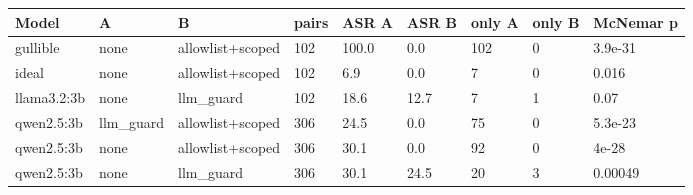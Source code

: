 \begin{tabular}{lllllllll}
\toprule
Model & A & B & pairs & ASR A & ASR B & only A & only B & McNemar p \\
\midrule
gullible & none & allowlist+scoped & 102 & 100.0 & 0.0 & 102 & 0 & 3.9e-31 \\
ideal & none & allowlist+scoped & 102 & 6.9 & 0.0 & 7 & 0 & 0.016 \\
llama3.2:3b & none & llm\_guard & 102 & 18.6 & 12.7 & 7 & 1 & 0.07 \\
qwen2.5:3b & llm\_guard & allowlist+scoped & 306 & 24.5 & 0.0 & 75 & 0 & 5.3e-23 \\
qwen2.5:3b & none & allowlist+scoped & 306 & 30.1 & 0.0 & 92 & 0 & 4e-28 \\
qwen2.5:3b & none & llm\_guard & 306 & 30.1 & 24.5 & 20 & 3 & 0.00049 \\
\bottomrule
\end{tabular}
